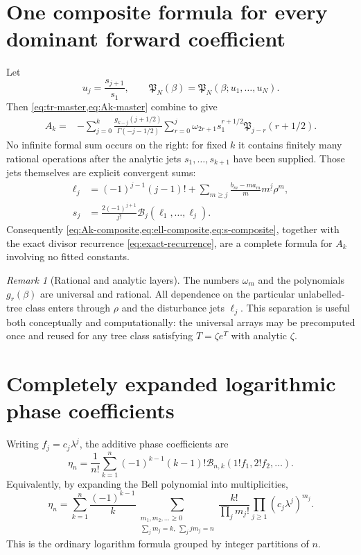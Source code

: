 \documentclass[11pt,a4paper,oneside,openany]{book}
\theoremstyle{definition}
\theoremstyle{remark}
\newtheorem{remark}[theorem]{Remark}
\newcommand{\Bell}[1]{\mathcal B_{#1}}
\newcommand{\pBell}[2]{\mathcal B_{#1,#2}}
\newcommand{\falling}[2]{#1^{\underline{#2}}}
\begin{document}
\section{One composite formula for every dominant forward coefficient}
Let
\begin{equation}
 u_j=\frac{s_{j+1}}{s_1},
 \qquad
 \mathfrak P_N(\beta)=
 \mathfrak P_N(\beta;u_1,\ldots,u_N).
 \label{eq:u-composite}
\end{equation}
Then \cref{eq:tr-master,eq:Ak-master} combine to give
\begin{align}
 A_k={}&-
 \sum_{j=0}^k\frac{g_{k-j}(j+1/2)}{\Gamma(-j-1/2)}
 \sum_{r=0}^{j}
 \omega_{2r+1}s_1^{r+1/2}
 \mathfrak P_{j-r}(r+1/2).
 \label{eq:Ak-composite}
\end{align}
No infinite formal sum occurs on the right: for fixed $k$ it contains finitely
many rational operations after the analytic jets $s_1,\ldots,s_{k+1}$ have
been supplied.  Those jets themselves are explicit convergent sums:
\begin{align}
 \ell_j
 & =(-1)^{j-1}(j-1)!+
 \sum_{m\ge j}\frac{b_m-ma_m}{m}\falling mj\rho^m,
 \label{eq:ell-composite}\\
 s_j
 & =\frac{2(-1)^{j+1}}{j!}
 \Bell j(\ell_1,\ldots,\ell_j).
 \label{eq:s-composite}
\end{align}
Consequently \cref{eq:Ak-composite,eq:ell-composite,eq:s-composite}, together
with the exact divisor recurrence \cref{eq:exact-recurrence}, are a complete
formula for $A_k$ involving no fitted constants.

\begin{remark}[Rational and analytic layers]
The numbers $\omega_m$ and the polynomials $g_r(\beta)$ are universal and
rational.  All dependence on the particular unlabelled-tree class enters
through $\rho$ and the disturbance jets $\ell_j$.  This separation is useful
both conceptually and computationally: the universal arrays may be precomputed
once and reused for any tree class satisfying $T=\zeta e^T$ with analytic
$\zeta$.
\end{remark}

\section{Completely expanded logarithmic phase coefficients}
Writing $f_j=c_j\lambda^j$, the additive phase coefficients are
\begin{equation}
 \boxed{
 \eta_n=\frac1{n!}\sum_{k=1}^n(-1)^{k-1}(k-1)!
 \pBell nk(1!f_1,2!f_2,\ldots).}
 \label{eq:eta-explicit-appendix}
\end{equation}
Equivalently, by expanding the Bell polynomial into multiplicities,
\begin{equation}
 \eta_n=
 \sum_{k=1}^{n}\frac{(-1)^{k-1}}{k}
 \sum_{\substack{m_1,m_2,\ldots\ge0\\
                  \sum_jm_j=k,\ \sum_jjm_j=n}}
 \frac{k!}{\prod_jm_j!}\prod_{j\ge1}(c_j\lambda^j)^{m_j}.
 \label{eq:eta-multiplicity}
\end{equation}
This is the ordinary logarithm formula grouped by integer partitions of $n$.
\end{document}

